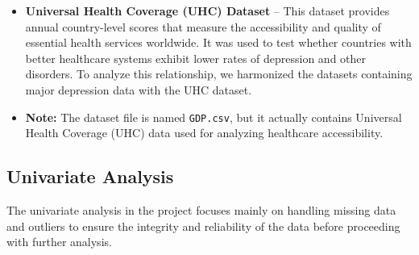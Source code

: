 \begin{itemize}
   \item \textbf{Universal Health Coverage (UHC) Dataset} – This dataset provides annual country-level scores that measure the accessibility and quality of essential health services worldwide. It was used to test whether countries with better healthcare systems exhibit lower rates of depression and other disorders. To analyze this relationship, we harmonized the datasets containing major depression data with the UHC dataset.

   \item \textbf{Note:} The dataset file is named \verb|GDP.csv|, but it actually contains Universal Health Coverage (UHC) data used for analyzing healthcare accessibility.
\end{itemize}

\subsection {Univariate Analysis} 
    
The univariate analysis in the project focuses mainly on handling missing data and outliers to ensure the integrity and reliability of the data before proceeding with further analysis.

